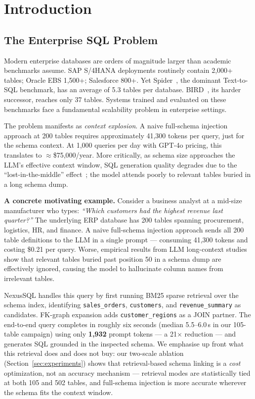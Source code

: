\documentclass[conference]{IEEEtran}
\begin{document}
\section{Introduction}
\label{sec:intro}

\subsection{The Enterprise SQL Problem}

Modern enterprise databases are orders of magnitude larger than academic
benchmarks assume. SAP S/4HANA deployments routinely contain 2,000+
tables; Oracle EBS 1,500+; Salesforce 800+. Yet Spider~\cite{spider},
the dominant Text-to-SQL benchmark, has an average of 5.3 tables per
database. BIRD~\cite{bird}, its harder successor, reaches only 37 tables.
Systems trained and evaluated on these benchmarks face a fundamental
scalability problem in enterprise settings.

The problem manifests as \emph{context explosion}. A naive full-schema
injection approach at 200 tables requires approximately 41,300 tokens per
query, just for the schema context. At 1,000 queries per day with
GPT-4o pricing, this translates to $\approx$\$75,000/year. More
critically, as schema size approaches the LLM's effective context
window, SQL generation quality degrades due to the
``lost-in-the-middle'' effect~\cite{lostmiddle}; the model attends
poorly to relevant tables buried in a long schema dump.

\textbf{A concrete motivating example.}
Consider a business analyst at a mid-size manufacturer who types:
\emph{``Which customers had the highest revenue last quarter?''}
The underlying ERP database has 200 tables spanning procurement,
logistics, HR, and finance. A naive full-schema injection approach
sends all 200 table definitions to the LLM in a single prompt --- consuming
41,300 tokens and costing \$0.21 per query. Worse, empirical results
from LLM long-context studies~\cite{lostmiddle} show that relevant
tables buried past position 50 in a schema dump are effectively ignored,
causing the model to hallucinate column names from irrelevant tables.

NexusSQL handles this query by first running BM25 sparse retrieval over
the schema index, identifying \texttt{sales\_orders}, \texttt{customers},
and \texttt{revenue\_summary} as candidates. FK-graph expansion adds
\texttt{customer\_regions} as a JOIN partner. The end-to-end query
completes in roughly six seconds (median 5.5--6.0\,s in our 105-table
campaign) using only \textbf{1,932} prompt tokens --- a 21$\times$
reduction --- and generates SQL grounded in the inspected schema.
We emphasise up front what this retrieval does and does not buy:
our two-scale ablation (Section~\ref{sec:experiments}) shows that
retrieval-based schema linking is a \emph{cost} optimization, not an
accuracy mechanism --- retrieval modes are statistically tied at both
105 and 502 tables, and full-schema injection is more accurate wherever
the schema fits the context window.
\end{document}
